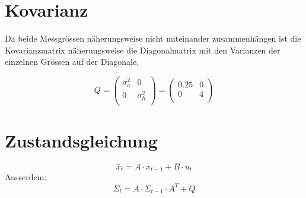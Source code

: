 \documentclass[12pt,a4paper]{article}
\begin{document}
\section{Kovarianz}
Da beide Messgrössen näherungsweise nicht miteinander zusammenhängen ist die Kovarianzmatrix näherungsweise die Diagonalmatrix mit den Varianzen der einzelnen Grössen auf der Diagonale.

\[
Q = \begin{pmatrix}
\sigma_a^2 & 0 \\
0 & \sigma_h^2 \\
\end{pmatrix}
 = \begin{pmatrix}
0.25 & 0 \\
0 & 4 \\
\end{pmatrix}
\]

\section{Zustandsgleichung}
\[\bar{x}_t = A \cdot x_{t-1} + B \cdot u_t\]
Ausserdem:
\[\bar{\Sigma}_t = A \cdot \Sigma_{t-1} \cdot A^T + Q\]
\end{document}
